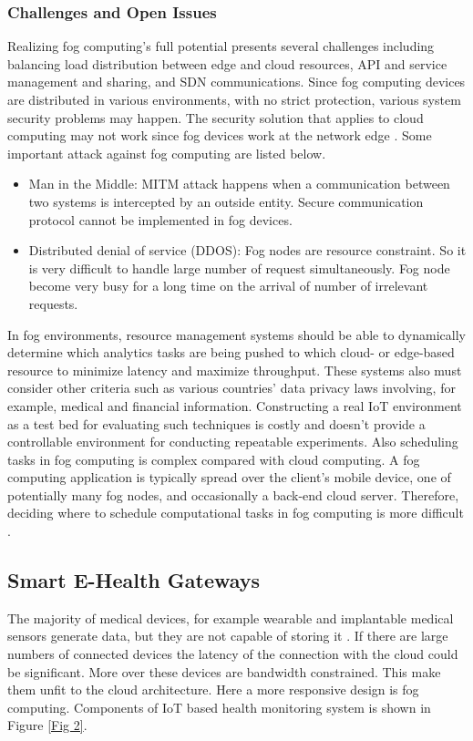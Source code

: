 \documentclass[10pt,a4paper,journal]{IEEEtran}
\begin{document}
\subsubsection{Challenges and Open Issues}
	Realizing fog computing's full potential presents several challenges including balancing load distribution between edge and cloud resources, API and service management and sharing, and SDN communications. Since fog computing devices are distributed in various environments, with no strict protection, various system security problems may happen. The security solution that applies to cloud computing may not work since fog devices work at the network edge \cite{4}. Some important attack against fog computing are listed below.
\begin{itemize}
\item Man in the Middle: MITM attack happens when a communication between two systems is intercepted by an outside entity. Secure communication protocol cannot be implemented in fog devices.
\item Distributed denial of service (DDOS): Fog nodes are resource constraint. So it is very difficult to handle large number of request simultaneously. Fog node become very busy for a long time on the arrival of number of irrelevant requests.
\end{itemize}

\hspace*{1em}	In fog environments, resource management systems should be able to dynamically determine which analytics tasks are being pushed to which cloud- or edge-based resource to minimize latency and maximize throughput. These systems also must consider other criteria such as various countries' data privacy laws involving, for example, medical and financial information.
	Constructing a real IoT environment as a test bed for evaluating such techniques is costly and doesn't provide a controllable environment for conducting repeatable experiments. Also scheduling tasks in fog computing is complex compared with cloud computing. A fog computing application is typically spread over the client's mobile device, one of potentially many fog nodes, and occasionally a back-end cloud server. Therefore, deciding where to schedule computational tasks in fog computing is more difficult \cite{5}.

\subsection{Smart E-Health Gateways} 
\hspace*{1em}	The majority of medical devices, for example wearable and implantable medical sensors generate data, but they are not capable of storing it \cite{6}. If there are large numbers of connected devices the latency of the connection with the cloud could be significant. More over these devices are bandwidth constrained. This make them unfit to the cloud architecture. Here a more responsive design is fog computing. Components of IoT based health monitoring system is shown in Figure \ref{Fig 2}. 
\end{document}
